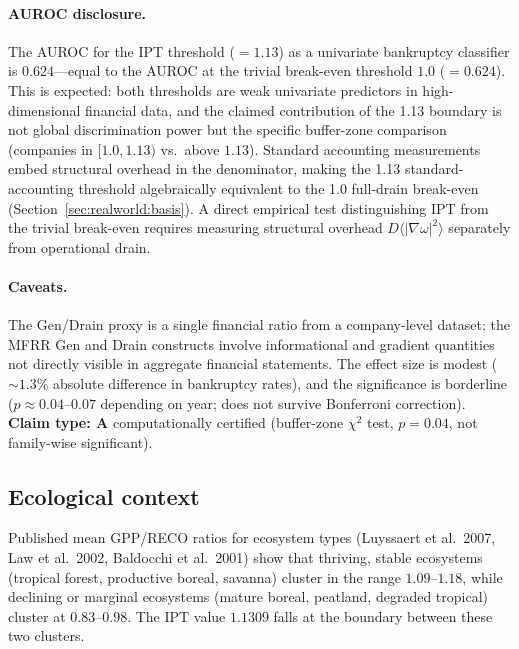 \documentclass[11pt,twocolumn]{article}
\newcommand{\CatA}{\textbf{A}}
\theoremstyle{remark}
\begin{document}
\paragraph{AUROC disclosure.}
The AUROC for the IPT threshold ($= 1.13$) as a univariate bankruptcy classifier is $0.624$---equal to the AUROC at the trivial break-even threshold $1.0$ ($= 0.624$). This is expected: both thresholds are weak univariate predictors in high-dimensional financial data, and the claimed contribution of the 1.13 boundary is not global discrimination power but the specific buffer-zone comparison (companies in $[1.0, 1.13)$ vs.\ above $1.13$). Standard accounting measurements embed structural overhead in the denominator, making the 1.13 standard-accounting threshold algebraically equivalent to the 1.0 full-drain break-even (Section~\ref{sec:realworld:basis}). A direct empirical test distinguishing IPT from the trivial break-even requires measuring structural overhead $D\langle|\nabla\omega|^2\rangle$ separately from operational drain.

\paragraph{Caveats.}
The Gen/Drain proxy is a single financial ratio from a company-level dataset; the MFRR Gen and Drain constructs involve informational and gradient quantities not directly visible in aggregate financial statements. The effect size is modest ($\sim 1.3\%$ absolute difference in bankruptcy rates), and the significance is borderline ($p \approx 0.04$--$0.07$ depending on year; does not survive Bonferroni correction). \textbf{Claim type: $\CatA$} computationally certified (buffer-zone $\chi^2$ test, $p=0.04$, not family-wise significant).

\subsection{Ecological context}
\label{sec:realworld:eco}

Published mean GPP/RECO ratios for ecosystem types (Luyssaert et al.\ 2007, Law et al.\ 2002, Baldocchi et al.\ 2001) show that thriving, stable ecosystems (tropical forest, productive boreal, savanna) cluster in the range $1.09$--$1.18$, while declining or marginal ecosystems (mature boreal, peatland, degraded tropical) cluster at $0.83$--$0.98$. The IPT value $1.1309$ falls at the boundary between these two clusters.
\end{document}

